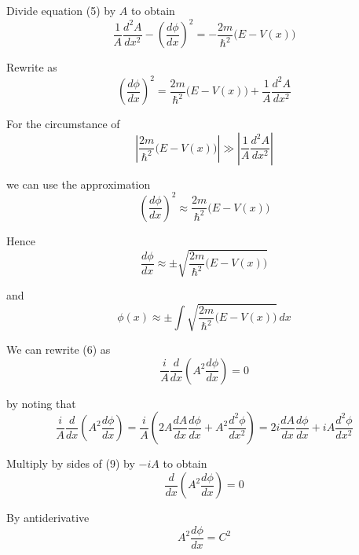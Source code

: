 Divide equation (5) by $A$ to obtain
\begin{equation*}
\frac{1}{A}\frac{d^2A}{dx^2}-\left(\frac{d\phi}{dx}\right)^2
=-\frac{2m}{\hbar^2}\bigl(E-V(x)\bigr)
\end{equation*}

Rewrite as
\begin{equation*}
\left(\frac{d\phi}{dx}\right)^2
=\frac{2m}{\hbar^2}\bigl(E-V(x)\bigr)+\frac{1}{A}\frac{d^2A}{dx^2}
\end{equation*}

For the circumstance of
\begin{equation*}
\left|\frac{2m}{\hbar^2}\bigl(E-V(x)\bigr)\right|
\gg
\left|\frac{1}{A}\frac{d^2A}{dx^2}\right|
\end{equation*}

we can use the approximation
\begin{equation*}
\left(\frac{d\phi}{dx}\right)^2\approx\frac{2m}{\hbar^2}\bigl(E-V(x)\bigr)
\end{equation*}

Hence
\begin{equation*}
\frac{d\phi}{dx}\approx\pm\sqrt{\frac{2m}{\hbar^2}\bigl(E-V(x)\bigr)}
\tag{7}
\end{equation*}

and
\begin{equation*}
\phi(x)\approx\pm\int\sqrt{\frac{2m}{\hbar^2}\bigl(E-V(x)\bigr)}\,dx
\tag{8}
\end{equation*}

We can rewrite (6) as
\begin{equation*}
\frac{i}{A}\frac{d}{dx}\left(A^2\frac{d\phi}{dx}\right)=0
\tag{9}
\end{equation*}

by noting that
\begin{equation*}
\frac{i}{A}\frac{d}{dx}\left(A^2\frac{d\phi}{dx}\right)
=\frac{i}{A}\left(2A\frac{dA}{dx}\frac{d\phi}{dx}+A^2\frac{d^2\phi}{dx^2}\right)
=2i\frac{dA}{dx}\frac{d\phi}{dx}+iA\frac{d^2\phi}{dx^2}
\end{equation*}

Multiply by sides of (9) by $-iA$ to obtain
\begin{equation*}
\frac{d}{dx}\left(A^2\frac{d\phi}{dx}\right)=0
\end{equation*}

By antiderivative
\begin{equation*}
A^2\frac{d\phi}{dx}=C^2
\end{equation*}

